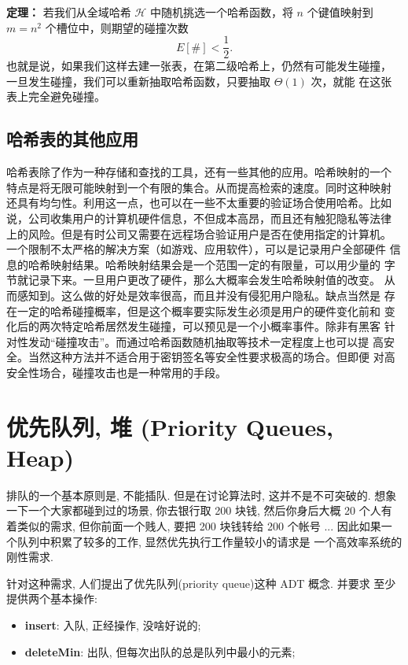 \documentclass[a4paper]{ctexart}
\theoremstyle{definition}
\theoremstyle{definition}
\begin{document}
{\bf 定理：} 若我们从全域哈希 $\mathscr{H}$ 中随机挑选一个哈希函数，将
$n$ 个键值映射到 $m = n^2$ 个槽位中，则期望的碰撞次数
$$
E[\#] < \frac{1}{2}.
$$
也就是说，如果我们这样去建一张表，在第二级哈希上，仍然有可能发生碰撞，
一旦发生碰撞，我们可以重新抽取哈希函数，只要抽取 $\Theta(1)$ 次，就能
在这张表上完全避免碰撞。



\subsection{哈希表的其他应用}

哈希表除了作为一种存储和查找的工具，还有一些其他的应用。哈希映射的一个
特点是将无限可能映射到一个有限的集合。从而提高检索的速度。同时这种映射
还具有均匀性。利用这一点，也可以在一些不太重要的验证场合使用哈希。比如
说，公司收集用户的计算机硬件信息，不但成本高昂，而且还有触犯隐私等法律
上的风险。但是有时公司又需要在远程场合验证用户是否在使用指定的计算机。
一个限制不太严格的解决方案（如游戏、应用软件），可以是记录用户全部硬件
信息的哈希映射结果。哈希映射结果会是一个范围一定的有限量，可以用少量的
字节就记录下来。一旦用户更改了硬件，那么大概率会发生哈希映射值的改变。
从而感知到。这么做的好处是效率很高，而且并没有侵犯用户隐私。缺点当然是
存在一定的哈希碰撞概率，但是这个概率要实际发生必须是用户的硬件变化前和
变化后的两次特定哈希居然发生碰撞，可以预见是一个小概率事件。除非有黑客
针对性发动“碰撞攻击”。而通过哈希函数随机抽取等技术一定程度上也可以提
高安全。当然这种方法并不适合用于密钥签名等安全性要求极高的场合。但即便
对高安全性场合，碰撞攻击也是一种常用的手段。

\section{优先队列, 堆 (Priority Queues, Heap)}

排队的一个基本原则是, 不能插队. 但是在讨论算法时, 这并不是不可突破的.
想象一下一个大家都碰到过的场景, 你去银行取 200 块钱, 然后你身后大概 20
个人有着类似的需求, 但你前面一个贱人, 要把 200 块钱转给 200 个帐号
... 因此如果一个队列中积累了较多的工作, 显然优先执行工作量较小的请求是
一个高效率系统的刚性需求.

针对这种需求, 人们提出了优先队列(priority queue)这种 ADT 概念. 并要求
至少提供两个基本操作:

\begin{itemize}
\item {\bf insert}: 入队, 正经操作, 没啥好说的;
\item {\bf deleteMin}: 出队, 但每次出队的总是队列中最小的元素; 
\end{itemize}
\end{document}
